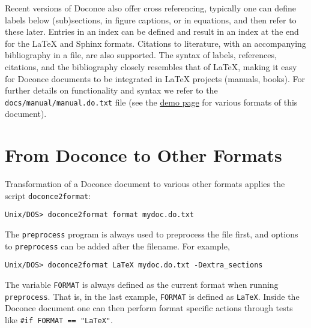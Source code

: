 \documentclass{article}
\begin{document}
Recent versions of Doconce also offer cross referencing, typically one
can define labels below (sub)sections, in figure captions, or in
equations, and then refer to these later. Entries in an index can be
defined and result in an index at the end for the {\LaTeX} and Sphinx
formats. Citations to literature, with an accompanying bibliography in
a file, are also supported. The syntax of labels, references,
citations, and the bibliography closely resembles that of {\LaTeX},
making it easy for Doconce documents to be integrated in {\LaTeX}
projects (manuals, books). For further details on functionality and
syntax we refer to the {\fontsize{10pt}{10pt}\verb!docs/manual/manual.do.txt!} file (see the
\href{https://doconce.googlecode.com/hg/trunk/docs/demos/manual/index.html}{demo
page} for various formats of this document).




\section{From Doconce to Other Formats}

\label{doconce2formats}

Transformation of a Doconce document to various other
formats applies the script {\fontsize{10pt}{10pt}\verb!doconce2format!}:
\vspace{4pt}
\begin{Verbatim}[numbers=none,frame=lines,label=\fbox{{\tiny Terminal}},fontsize=\fontsize{9pt}{9pt},
labelposition=topline,framesep=2.5mm,framerule=0.7pt]
Unix/DOS> doconce2format format mydoc.do.txt
\end{Verbatim}
The {\fontsize{10pt}{10pt}\verb!preprocess!} program is always used to preprocess the file first,
and options to {\fontsize{10pt}{10pt}\verb!preprocess!} can be added after the filename. For example,
\vspace{4pt}
\begin{Verbatim}[numbers=none,frame=lines,label=\fbox{{\tiny Terminal}},fontsize=\fontsize{9pt}{9pt},
labelposition=topline,framesep=2.5mm,framerule=0.7pt]
Unix/DOS> doconce2format LaTeX mydoc.do.txt -Dextra_sections
\end{Verbatim}
The variable {\fontsize{10pt}{10pt}\verb!FORMAT!} is always defined as the current format when
running {\fontsize{10pt}{10pt}\verb!preprocess!}. That is, in the last example, {\fontsize{10pt}{10pt}\verb!FORMAT!} is
defined as {\fontsize{10pt}{10pt}\verb!LaTeX!}. Inside the Doconce document one can then perform
format specific actions through tests like {\fontsize{10pt}{10pt}\verb!#if FORMAT == "LaTeX"!}.
\end{document}
